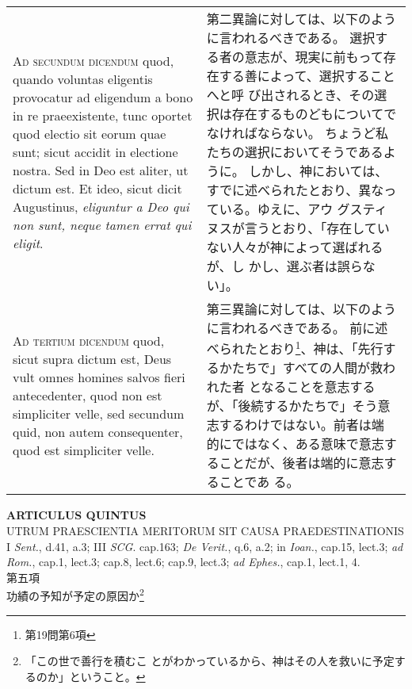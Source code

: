 \documentclass[10pt]{jsarticle} %
\begin{document}
\begin{longtable}{p{21em}p{21em}}
{\scshape Ad secundum dicendum} quod, quando voluntas
 eligentis provocatur ad eligendum a bono in re praeexistente, tunc
 oportet quod electio sit eorum quae sunt; sicut accidit in electione
 nostra. Sed in Deo est aliter, ut dictum est. Et ideo, sicut dicit
 Augustinus, {\itshape eliguntur a Deo qui non sunt, neque tamen errat qui eligit}.


&

第二異論に対しては、以下のように言われるべきである。
選択する者の意志が、現実に前もって存在する善によって、選択することへと呼
 び出されるとき、その選択は存在するものどもについてでなければならない。
ちょうど私たちの選択においてそうであるように。
しかし、神においては、すでに述べられたとおり、異なっている。ゆえに、アウ
 グスティヌスが言うとおり、「存在していない人々が神によって選ばれるが、し
 かし、選ぶ者は誤らない」。


\\



{\scshape Ad tertium dicendum} quod, sicut supra dictum
 est, Deus vult omnes homines salvos fieri antecedenter, quod non est
 simpliciter velle, sed secundum quid, non autem consequenter, quod est
 simpliciter velle.


&

第三異論に対しては、以下のように言われるべきである。
前に述べられたとおり\footnote{第19問第6項}、神は、「先行するかたちで」すべての人間が救われた者
 となることを意志するが、「後続するかたちで」そう意志するわけではない。前者は端
 的にではなく、ある意味で意志することだが、後者は端的に意志することであ
 る。





\end{longtable}
\newpage




\begin{center}
 {\Large {\bf ARTICULUS QUINTUS}}\\
 {\large UTRUM PRAESCIENTIA MERITORUM SIT CAUSA PRAEDESTINATIONIS}\\
 {\footnotesize I {\itshape Sent.}, d.41, a.3; III {\itshape
 SCG}. cap.163; {\itshape De Verit.}, q.6, a.2; in {\itshape Ioan.},
 cap.15, lect.3; {\itshape ad Rom.}, cap.1, lect.3; cap.8, lect.6;
 cap.9, lect.3; {\itshape ad Ephes.}, cap.1, lect.1, 4.}\\
 {\Large 第五項\\功績の予知が予定の原因か}\footnote{「この世で善行を積むこ
 とがわかっているから、神はその人を救いに予定するのか」ということ。}
\end{center}
\end{document}

